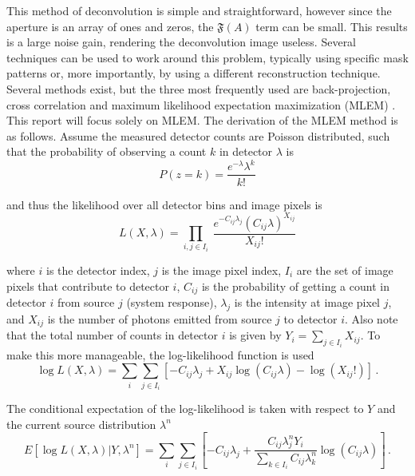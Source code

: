 \documentclass[10pt]{article}
\begin{document}
\noindent This method of deconvolution is simple and straightforward, however since the aperture is an array of ones and zeros, the $\mathfrak{F}(A)$ term can be small. This results is a large noise gain, rendering the deconvolution image useless. Several techniques can be used to work around this problem, typically using specific mask patterns or, more importantly, by using a different reconstruction technique. Several methods exist, but the three most frequently used are back-projection, cross correlation and maximum likelihood expectation maximization (MLEM) \cite{LangeCarson1984}. This report will focus solely on MLEM. The derivation of the MLEM method is as follows. Assume the measured detector counts are Poisson distributed, such that the probability of observing a count $k$ in detector $\lambda$ is 
%
\begin{equation}
	P(z=k)  = \frac{e^{-\lambda} \lambda^k}{k!}
\end{equation}

\noindent and thus the likelihood over all detector bins and image pixels is 
%
\begin{equation}
	L(X,\lambda) = \prod_{i,j\in I_i} \ \frac{e^{-C_{ij}\lambda_j} (C_{ij}\lambda)^{X_{ij}}}{X_{ij}!}
\end{equation}

\noindent where $i$ is the detector index, $j$ is the image pixel index, $I_i$ are the set of image pixels that contribute to detector $i$, $C_{ij}$ is the probability of getting a count in detector $i$ from source $j$ (system response), $\lambda_j$ is the intensity at image pixel $j$, and $X_{ij}$ is the number of photons emitted from source $j$ to detector $i$. Also note that the total number of counts in detector $i$ is given by $Y_i=\sum_{j \in I_i} X_{ij}$. To make this more manageable, the log-likelihood function is used
%
\begin{equation}
	\log L(X,\lambda) = \sum_i \sum_{j \in I_i} \left[ -C_{ij} \lambda_j + X_{ij} \log (C_{ij} \lambda) - \log (X_{ij}!) \right]\,.
\end{equation}

\noindent The conditional expectation of the log-likelihood is taken with respect to $Y$ and the current source distribution $\lambda^n$
%
\begin{equation}
	E[\log L(X,\lambda) | Y,\lambda^n] = \sum_i \sum_{j \in I_i} \left[   -C_{ij} \lambda_j + \frac{C_{ij}\lambda_j^n Y_i}{\sum_{k \in I_i}C_{ij}\lambda_k^n }   \log (C_{ij} \lambda)   \right]\,.
\end{equation}
\end{document}
